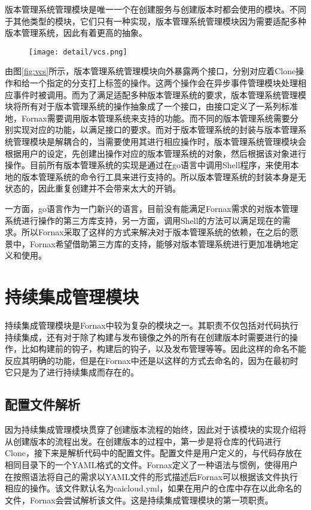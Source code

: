 版本管理系统管理模块是唯一一个在创建服务与创建版本时都会使用的模块。不同于其他类型的模块，它们只有一种实现，版本管理系统管理模块因为需要适配多种版本管理系统，因此有着更高的抽象。

\begin{figure}[!htp]
  \centering
  \texttt{[image: detail/vcs.png]}
\end{figure}

由图\ref{fig:vcs}所示，版本管理系统管理模块向外暴露两个接口，分别对应着Clone操作和给一个指定的分支打上标签的操作。这两个操作会在异步事件管理模块处理相应事件时被调用。而为了满足适配多种版本管理系统的要求，版本管理系统管理模块将所有对于版本管理系统的操作抽象成了一个接口，由接口定义了一系列标准地，Fornax需要调用版本管理系统来支持的功能。而不同的版本管理系统需要分别实现对应的功能，以满足接口的要求。而对于版本管理系统的封装与版本管理系统管理模块是解耦合的，当需要使用其进行相应操作时，版本管理系统管理模块会根据用户的设定，先创建出操作对应的版本管理系统的对象，然后根据该对象进行操作。目前所有版本管理系统的实现是通过在go语言中调用Shell程序，来使用本地的版本管理系统的命令行工具来进行支持的。所以版本管理系统的封装本身是无状态的，因此重复创建并不会带来太大的开销。

一方面，go语言作为一门新兴的语言，目前没有能满足Fornax需求的对版本管理系统进行操作的第三方库支持，另一方面，调用Shell的方法可以满足现在的需求。所以Fornax采取了这样的方式来解决对于版本管理系统的依赖，在之后的愿景中，Fornax希望借助第三方库的支持，能够对版本管理系统进行更加准确地定义和使用。

\section{持续集成管理模块}

持续集成管理模块是Fornax中较为复杂的模块之一。其职责不仅包括对代码执行持续集成，还有对于除了构建与发布镜像之外的所有在创建版本时需要进行的操作，比如构建前的钩子，构建后的钩子，以及发布管理等等。因此这样的命名不能反应其明确的功能，但是在Fornax中还是以这样的方式去命名的，因为在最初时它只是为了进行持续集成而存在的。

\subsection{配置文件解析}

因为持续集成管理模块贯穿了创建版本流程的始终，因此对于该模块的实现介绍将从创建版本的流程出发。在创建版本的过程中，第一步是将仓库的代码进行Clone，接下来是解析代码中的配置文件。配置文件是用户定义的，与代码存放在相同目录下的一个YAML格式的文件。Fornax定义了一种语法与惯例，使得用户在按照语法将自己的需求以YAML文件的形式描述后Fornax可以根据该文件执行相应的操作。该文件默认名为caicloud.yml，如果在用户的仓库中存在以此命名的文件，Fornax会尝试解析该文件。这是持续集成管理模块的第一项职责。

